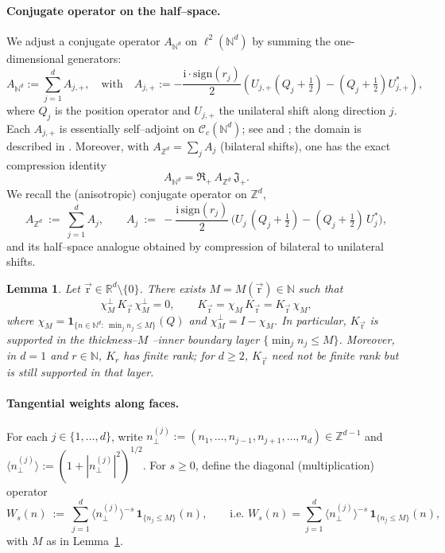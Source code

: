 \documentclass[10pt]{amsart}
\newcommand{\R}{{\mathbb{R}}}
\newcommand{\Z}{{\mathbb{Z}}}
\newcommand{\N}{{\mathbb{N}}}
\newcommand{\1}{{\mathbb{I}}}
\numberwithin{equation}{section}
\newtheorem{lemma}[theorem]{Lemma}%
\begin{document}
\paragraph{Conjugate operator on the half--space.}
We adjust a conjugate operator \(A_{\N^d}\) on \( \ell^2(\N^d) \) by summing the one-dimensional generators:
\begin{equation}\label{ComNd}
A_{\N^d} := \sum_{j=1}^d A_{j,+},
\quad \text{with} \quad
A_{j,+} := -\frac{\mathrm{i} \cdot \mathrm{sign}(r_j)}{2} \left( U_{j,+}(Q_j + \tfrac{1}{2}) - (Q_j + \tfrac{1}{2}) U_{j,+}^* \right),
\end{equation}
where \(Q_j\) is the position operator and \(U_{j,+}\) the unilateral shift along direction \(j\).
Each \(A_{j,+}\) is essentially self--adjoint on \(\mathcal{C}_c(\N^d)\); see \cite{GG} and \cite[Lemma 5.7]{Mic}; the domain is described in \cite[Lemma 3.1]{GG}.
Moreover, with $A_{\Z^d}=\sum_j A_j$ (bilateral shifts), one has the exact compression identity
\[
A_{\N^d}=\mathfrak{R}_+\,A_{\Z^d}\,\mathfrak{J}_+.
\]
We recall the (anisotropic) conjugate operator on $\Z^d$,
\[
A_{\Z^d}\ :=\ \sum_{j=1}^d A_j,\qquad
A_j\ :=\ -\frac{\mathrm i\,\mathrm{sign}(r_j)}{2}\,\Big(U_j\,(Q_j+\tfrac12)-(Q_j+\tfrac12)\,U_j^*\Big),
\]
and its half--space analogue obtained by compression of bilateral to unilateral shifts.
\begin{lemma}\label{lem:K-support-layer}
Let $\vec{\mathrm{r}}\in\R^d\setminus\{0\}$. There exists $M=M(\vec{\mathrm{r}})\in\N$ such that
\[
\chi_M^\perp\,K_{\vec{\mathrm{r}}}\,\chi_M^\perp=0,\qquad
K_{\vec{\mathrm{r}}}=\chi_M\,K_{\vec{\mathrm{r}}}=K_{\vec{\mathrm{r}}}\,\chi_M,
\]
where $\chi_M=\mathbf 1_{\{n\in\N^d:\ \min_j n_j\le M\}}(Q)$ and $\chi_M^\perp=I-\chi_M$.
In particular, $K_{\vec{\mathrm{r}}}$ is supported in the thickness--$M$ --inner boundary layer $\{ \min_j n_j\le M\}$.
Moreover, in $d=1$ and $r\in\N$, $K_r$ has finite rank; for $d\ge2$, $K_{\vec{\mathrm{r}}}$ need not be finite rank but is still supported in that layer.
\end{lemma}

\paragraph{Tangential weights along faces.}
For each $j\in\{1,\dots,d\}$, write $n_\perp^{(j)}:=(n_1,\dots,n_{j-1},n_{j+1},\dots,n_d)\in\Z^{d-1}$ and
$\langle n_\perp^{(j)}\rangle:=(1+|n_\perp^{(j)}|^2)^{1/2}$. For $s\ge0$, define the diagonal (multiplication) operator
\[
W_s(n)\ :=\ \sum_{j=1}^d \langle n_\perp^{(j)}\rangle^{-s}\,\mathbf{1}_{\{n_j\le M\}}(n),
\qquad \text{i.e. }W_s(n)=\sum_{j=1}^d \langle n_\perp^{(j)}\rangle^{-s}\,\mathbf{1}_{\{n_j\le M\}}(n)
,
\]
with $M$ as in Lemma~\ref{lem:K-support-layer}.
\end{document}
